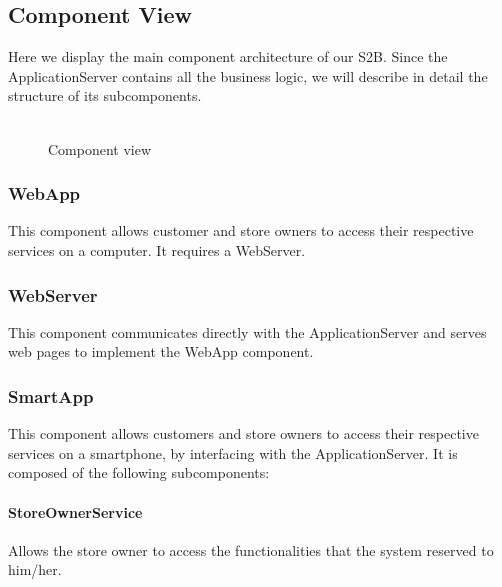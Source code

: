 \subsection{Component View}
Here we display the main component architecture of our S2B. Since the ApplicationServer contains all the business logic, we will describe in detail the structure of its subcomponents.\\\\
\begin{figure}[H]
	\noindent
	\caption{Component view} 
\end{figure}
\subsubsection{WebApp}
This component allows customer and store owners to access their respective services on a computer. It requires a WebServer.
\subsubsection{WebServer}
This component communicates directly with the ApplicationServer and serves web pages to implement the WebApp component.
\subsubsection{SmartApp}
This component allows customers and store owners to access their respective services on a smartphone, by interfacing with the ApplicationServer. It is composed of the following subcomponents:
\paragraph{StoreOwnerService}Allows the store owner to access the functionalities that the system reserved to him/her.
